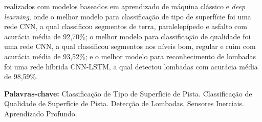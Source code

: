 \begin{resumo}[Resumo]
realizados com modelos baseados em aprendizado de máquina clássico e \textit{deep learning}, onde o melhor modelo para classificação de tipo de superfície foi uma rede CNN, a qual classificou segmentos de terra, paralelepípedo e asfalto com acurácia média de 92,70\%; o melhor modelo para classificação de qualidade foi uma rede CNN, a qual classificou segmentos nos níveis bom, regular e ruim com acurácia média de 93,52\%; e o melhor modelo para reconhecimento de lombadas foi uma rede híbrida CNN-LSTM, a qual detectou lombadas com acurácia média de 98,59\%.
    
  \vspace{\baselineskip} 
  \textbf{Palavras-chave:} 
  Classificação de Tipo de Superfície de Pista.
  Classificação de Qualidade de Superfície de Pista.
  Detecção de Lombadas.
  Sensores Inerciais. 
  Aprendizado Profundo.
  
\end{resumo}
